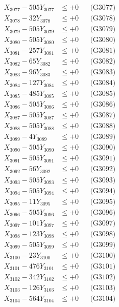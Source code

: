 \documentclass[a4paper,10pt]{article}
\begin{document}
{\begin{align}
X_{3077} - 505Y_{3077} &\leq +0 && \text{(G3077)} \\
X_{3078} - 32Y_{3078} &\leq +0 && \text{(G3078)} \\
X_{3079} - 505Y_{3079} &\leq +0 && \text{(G3079)} \\
X_{3080} - 505Y_{3080} &\leq +0 && \text{(G3080)} \\
\allowbreak
X_{3081} - 257Y_{3081} &\leq +0 && \text{(G3081)} \\
X_{3082} - 65Y_{3082} &\leq +0 && \text{(G3082)} \\
X_{3083} - 96Y_{3083} &\leq +0 && \text{(G3083)} \\
X_{3084} - 127Y_{3084} &\leq +0 && \text{(G3084)} \\
X_{3085} - 485Y_{3085} &\leq +0 && \text{(G3085)} \\
X_{3086} - 505Y_{3086} &\leq +0 && \text{(G3086)} \\
X_{3087} - 505Y_{3087} &\leq +0 && \text{(G3087)} \\
X_{3088} - 505Y_{3088} &\leq +0 && \text{(G3088)} \\
X_{3089} - 4Y_{3089} &\leq +0 && \text{(G3089)} \\
X_{3090} - 505Y_{3090} &\leq +0 && \text{(G3090)} \\
\allowbreak
X_{3091} - 505Y_{3091} &\leq +0 && \text{(G3091)} \\
X_{3092} - 56Y_{3092} &\leq +0 && \text{(G3092)} \\
X_{3093} - 505Y_{3093} &\leq +0 && \text{(G3093)} \\
X_{3094} - 505Y_{3094} &\leq +0 && \text{(G3094)} \\
X_{3095} - 11Y_{3095} &\leq +0 && \text{(G3095)} \\
X_{3096} - 505Y_{3096} &\leq +0 && \text{(G3096)} \\
X_{3097} - 101Y_{3097} &\leq +0 && \text{(G3097)} \\
X_{3098} - 123Y_{3098} &\leq +0 && \text{(G3098)} \\
X_{3099} - 505Y_{3099} &\leq +0 && \text{(G3099)} \\
X_{3100} - 23Y_{3100} &\leq +0 && \text{(G3100)} \\
\allowbreak
X_{3101} - 476Y_{3101} &\leq +0 && \text{(G3101)} \\
X_{3102} - 342Y_{3102} &\leq +0 && \text{(G3102)} \\
X_{3103} - 126Y_{3103} &\leq +0 && \text{(G3103)} \\
X_{3104} - 564Y_{3104} &\leq +0 && \text{(G3104)} \\

\end{align}}
\end{document}
